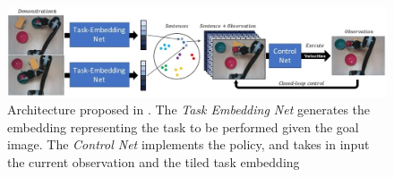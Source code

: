 \begin{figure}[t]
    \centering
    \includegraphics[width=\textwidth]{figures/images/task_embedded/task_embedded.jpg}
    \caption{Architecture proposed in \cite{james2018task_embedded}. The \textit{Task Embedding Net} generates the embedding representing the task to be performed given the goal image. The \textit{Control Net} implements the policy, and takes in input the current observation and the tiled task embedding}
    \label{fig:task_embedded}
\end{figure}
